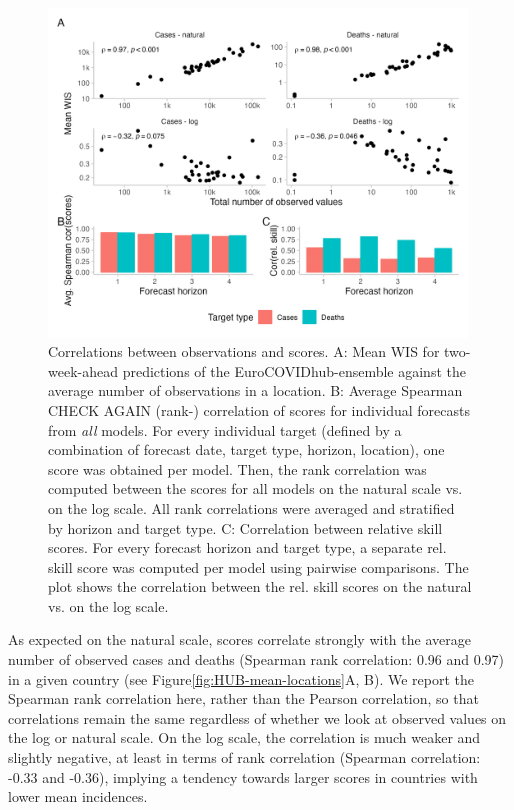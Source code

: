 \documentclass{article}
\begin{document}
\begin{figure}[h!]
    \centering
    \includegraphics[width=0.99\textwidth]{output/figures/HUB-correlations.png}
    \caption{Correlations between observations and scores. A: Mean WIS for two-week-ahead predictions of the EuroCOVIDhub-ensemble against the average number of observations in a location. B: Average Spearman CHECK AGAIN (rank-) correlation of scores for individual forecasts from \textit{all} models. For every individual target (defined by a combination of forecast date, target type, horizon, location), one score was obtained per model. Then, the rank correlation was computed between the scores for all models on the natural scale vs. on the log scale. All rank correlations were averaged and stratified by horizon and target type. C: Correlation between relative skill scores. For every forecast horizon and target type, a separate rel. skill score was computed per model using pairwise comparisons. The plot shows the correlation between the rel. skill scores on the natural vs. on the log scale.}
    \label{fig:HUB-cors}
\end{figure}

As expected on the natural scale, scores correlate strongly with the average number of observed cases and deaths (Spearman rank correlation: 0.96 and 0.97) in a given country (see Figure\ref{fig:HUB-mean-locations}A, B). We report the Spearman rank correlation here, rather than the Pearson correlation, so that correlations remain the same regardless of whether we look at observed values on the log or natural scale. 
On the log scale, the correlation is much weaker and slightly negative, at least in terms of rank correlation (Spearman correlation: -0.33 and -0.36), implying a tendency towards larger scores in countries with lower mean incidences. 
\end{document}
